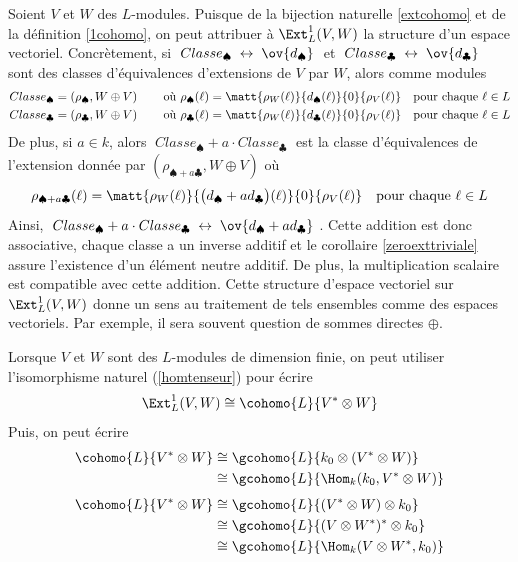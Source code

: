 \begin{Rem} Soient $V$ et $W$ des $L$-modules. Puisque de la bijection naturelle \ref{extcohomo} et de la définition \ref{1cohomo}, on peut attribuer à $\Ext_L^1(V,W)$ la structure d'un espace vectoriel. Concrètement, si $\;Classe_\spadesuit \; \leftrightarrow \; \ov{d_\spadesuit}\;$ et $\;Classe_\clubsuit \; \leftrightarrow \; \ov{d_\clubsuit}\;$ sont des classes d'équivalences d'extensions de $V$ par $W$, alors comme modules
\begin{align}
Classe_\spadesuit &= \left(\rho_\spadesuit, W \oplus V\right) \qquad \text{où } \rho_\spadesuit(\ell) = \matt{\rho_W(\ell)}{d_\spadesuit(\ell)}{0}{\rho_V(\ell)} \quad \text{pour chaque } \ell \in L \\
Classe_\clubsuit &= \left(\rho_\clubsuit, W \oplus V\right) \qquad \text{où } \rho_\clubsuit(\ell) = \matt{\rho_W(\ell)}{d_\clubsuit(\ell)}{0}{\rho_V(\ell)} \quad \text{pour chaque } \ell \in L
\end{align}
De plus, si $a \in k$, alors $\;Classe_\spadesuit + a \cdot Classe_\clubsuit\;$ est la classe d'équivalences de l'extension donnée par $(\rho_{\spadesuit+a\clubsuit},W \oplus V)$ où 
$$ \rho_{\spadesuit+a\clubsuit}(\ell) = \matt{\rho_W(\ell)}{\big(d_\spadesuit + ad_\clubsuit\big)(\ell)}{0}{\rho_V(\ell)} \quad \text{pour chaque } \ell \in L $$
Ainsi, $\;Classe_\spadesuit + a \cdot Classe_\clubsuit \; \leftrightarrow \; \ov{d_\spadesuit+ad_\clubsuit}\;$. Cette addition est donc associative, chaque classe a un inverse additif et le corollaire \ref{zeroexttriviale} assure l'existence d'un élément neutre additif. De plus, la multiplication scalaire est compatible avec cette addition. Cette structure d'espace vectoriel sur $\Ext^1_L(V,W)$ donne un sens au traitement de tels ensembles comme des espaces vectoriels. Par exemple, il sera souvent question de sommes directes $\oplus$.
\end{Rem}

Lorsque $V$ et $W$ sont des $L$-modules de dimension finie, on peut utiliser l'isomorphisme naturel (\ref{homtenseur}) pour écrire 
\begin{equation}
\Ext_L^1(V,W) \cong \cohomo{L}{V^* \otimes W}
\end{equation}
Puis, on peut écrire
\begin{align*}
\cohomo{L}{V^* \otimes W} &\cong \gcohomo{L}{k_0 \otimes (V^* \otimes W)}\\
&\cong \gcohomo{L}{\Hom_k(k_0,V^* \otimes W)}
\end{align*}
\begin{align*}
\cohomo{L}{V^* \otimes W} &\cong \gcohomo{L}{(V^* \otimes W) \otimes k_0}\\
&\cong \gcohomo{L}{(V \otimes W^*)^* \otimes k_0}\\
&\cong \gcohomo{L}{\Hom_k(V \otimes W^*,k_0)}
\end{align*}

